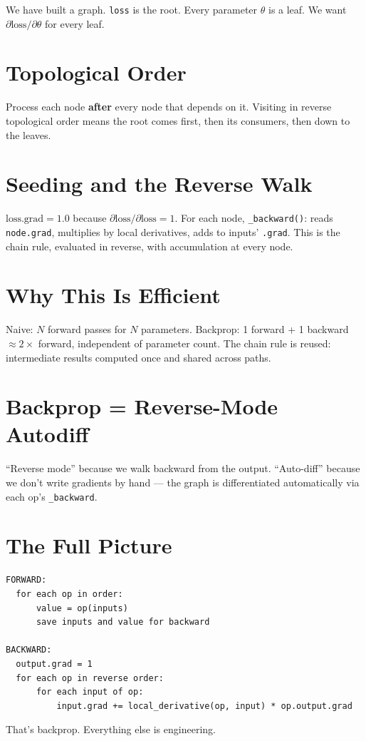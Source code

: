 \documentclass[11pt,a4paper]{book}
\begin{document}
We have built a graph. \texttt{loss} is the root. Every parameter $\theta$ is a leaf. We want $\partial\text{loss}/\partial\theta$ for every leaf.

\section{Topological Order}

Process each node \textbf{after} every node that depends on it. Visiting in reverse topological order means the root comes first, then its consumers, then down to the leaves.

\section{Seeding and the Reverse Walk}

$\text{loss.grad} = 1.0$ because $\partial\text{loss}/\partial\text{loss} = 1$.
For each node, \texttt{\_backward()}: reads \texttt{node.grad}, multiplies by local derivatives, adds to inputs' \texttt{.grad}.
This is the chain rule, evaluated in reverse, with accumulation at every node.

\section{Why This Is Efficient}

Naive: $N$ forward passes for $N$ parameters.
Backprop: 1 forward + 1 backward $\approx 2\times$ forward, independent of parameter count.
The chain rule is reused: intermediate results computed once and shared across paths.

\section{Backprop = Reverse-Mode Autodiff}

``Reverse mode'' because we walk backward from the output. ``Auto-diff'' because we don't write gradients by hand --- the graph is differentiated automatically via each op's \texttt{\_backward}.

\section{The Full Picture}

\begin{verbatim}
FORWARD:
  for each op in order:
      value = op(inputs)
      save inputs and value for backward

BACKWARD:
  output.grad = 1
  for each op in reverse order:
      for each input of op:
          input.grad += local_derivative(op, input) * op.output.grad
\end{verbatim}
That's backprop. Everything else is engineering.
\end{document}
